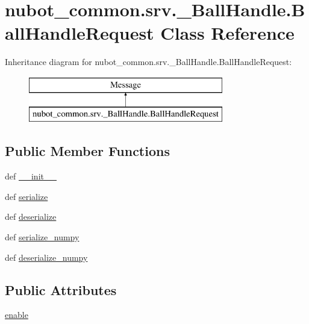 \hypertarget{classnubot__common_1_1srv_1_1__BallHandle_1_1BallHandleRequest}{\section{nubot\-\_\-common.\-srv.\-\_\-\-Ball\-Handle.\-Ball\-Handle\-Request Class Reference}
\label{classnubot__common_1_1srv_1_1__BallHandle_1_1BallHandleRequest}
}
Inheritance diagram for nubot\-\_\-common.\-srv.\-\_\-\-Ball\-Handle.\-Ball\-Handle\-Request\-:\begin{figure}[H]
\begin{center}
\leavevmode
\includegraphics[height=2.000000cm]{classnubot__common_1_1srv_1_1__BallHandle_1_1BallHandleRequest}
\end{center}
\end{figure}
\subsection*{Public Member Functions}
\begin{DoxyCompactItemize}
\item 
def \hyperlink{classnubot__common_1_1srv_1_1__BallHandle_1_1BallHandleRequest_a4084565470531a8794f3129fa10a0fb9}{\-\_\-\-\_\-init\-\_\-\-\_\-}
\item 
def \hyperlink{classnubot__common_1_1srv_1_1__BallHandle_1_1BallHandleRequest_a6ed32d31bd0fd933f879e68c7b5daf26}{serialize}
\item 
def \hyperlink{classnubot__common_1_1srv_1_1__BallHandle_1_1BallHandleRequest_a66bf85379b50762b2ea70a76f89df690}{deserialize}
\item 
def \hyperlink{classnubot__common_1_1srv_1_1__BallHandle_1_1BallHandleRequest_a4a22ad4abb861e7a09d2f64deacd42fb}{serialize\-\_\-numpy}
\item 
def \hyperlink{classnubot__common_1_1srv_1_1__BallHandle_1_1BallHandleRequest_a66d8c0bbb58e02a128389116fbcd673a}{deserialize\-\_\-numpy}
\end{DoxyCompactItemize}
\subsection*{Public Attributes}
\begin{DoxyCompactItemize}
\item 
\hyperlink{classnubot__common_1_1srv_1_1__BallHandle_1_1BallHandleRequest_abfcbfca110adbedb7639ae12940532db}{enable}
\end{DoxyCompactItemize}

